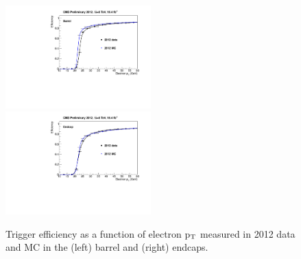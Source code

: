 \begin{figure}[h!]
\includegraphics[width=0.5\textwidth]{plots/TagAndProbe/ElectronBarrel2012DatavsMC.pdf}
\includegraphics[width=0.5\textwidth]{plots/TagAndProbe/ElectronEndcap2012DatavsMC.pdf}
\caption{Trigger efficiency as a function of electron p$_{\rm{T}}$ measured
in 2012 data and MC in the (left) barrel and (right) endcaps.}
\label{fig:electrontrg}
\end{figure}

